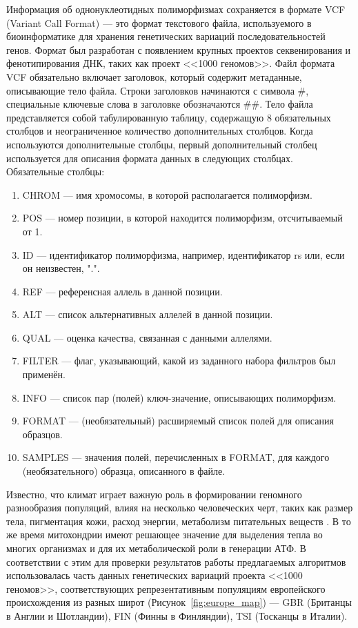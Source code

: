 Информация об однонуклеотидных полиморфизмах сохраняется в формате VCF (Variant Call Format) --- это формат текстового файла, используемого в биоинформатике для хранения генетических вариаций последовательностей генов. Формат был разработан с появлением крупных проектов секвенирования и фенотипирования ДНК, таких как проект <<1000 геномов>>. Файл формата VCF обязательно включает заголовок, который содержит метаданные, описывающие тело файла. Строки заголовков начинаются с символа $\#$, специальные ключевые слова в заголовке обозначаются $\#\#$. Тело файла представляется собой табулированную таблицу, содержащую 8 обязательных столбцов и неограниченное количество дополнительных столбцов. Когда используются дополнительные столбцы, первый дополнительный столбец используется для описания формата данных в следующих столбцах. Обязательные столбцы:
\begin{enumerate}
	\item CHROM --- имя хромосомы, в которой располагается полиморфизм. 
	\item POS --- номер позиции, в которой находится полиморфизм, отсчитываемый от 1.
	\item ID --- идентификатор полиморфизма, например, идентификатор rs или, если он неизвестен, ".".
	\item REF --- референсная аллель в данной позиции.
	\item ALT --- список альтернативных аллелей в данной позиции.
	\item QUAL --- оценка качества, связанная с данными аллелями.
	\item FILTER --- флаг, указывающий, какой из заданного набора фильтров был применён.
	\item INFO --- список пар (полей) ключ-значение, описывающих полиморфизм. 
	\item FORMAT --- (необязательный) расширяемый список полей для описания образцов.
	\item SAMPLES --- значения полей, перечисленных в FORMAT, для каждого (необязательного) образца, описанного в файле.
\end{enumerate}

Известно, что климат играет важную роль в формировании геномного разнообразия популяций, влияя на несколько человеческих черт, таких как размер тела, пигментация кожи, расход энергии, метаболизм питательных веществ \autocite{Sturm2012, Hancock2011adaptations, Quagliarello2017}. В то же время митохондрии имеют решающее значение для выделения тепла во многих организмах и для их метаболической роли в генерации АТФ. В соответствии с этим для проверки результатов работы предлагаемых алгоритмов использовалась часть данных генетических вариаций проекта <<1000 геномов>>, соответствующих репрезентативным популяциям европейского происхождения из разных широт (Рисунок~\ref{fig:europe_map}) --- GBR (Британцы в Англии и Шотландии), FIN (Финны в Финляндии), TSI (Тосканцы в Италии).

